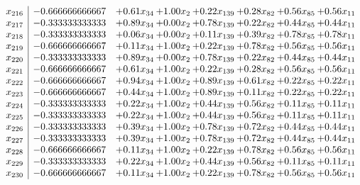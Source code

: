 \documentclass[8pt]{article}
\begin{document}
\[\begin{array}{c| c c@{\hskip 2pt} c@{\hskip 2pt} c@{\hskip 2pt} c@{\hskip 2pt} c@{\hskip 2pt} c@{\hskip 2pt} }
 x_{216}   &  -0.666666666667 & +  0.61 x_{34} & +  1.00 x_{2} & +  0.22 x_{139} & +  0.28 x_{82} & +  0.56 x_{85} & +  0.56 x_{11}\\
 x_{217}   &  -0.333333333333 & +  0.89 x_{34} & +  0.00 x_{2} & +  0.78 x_{139} & +  0.22 x_{82} & +  0.44 x_{85} & +  0.44 x_{11}\\
 x_{218}   &  -0.333333333333 & +  0.06 x_{34} & +  0.00 x_{2} & +  0.11 x_{139} & +  0.39 x_{82} & +  0.78 x_{85} & +  0.78 x_{11}\\
 x_{219}   &  -0.666666666667 & +  0.11 x_{34} & +  1.00 x_{2} & +  0.22 x_{139} & +  0.78 x_{82} & +  0.56 x_{85} & +  0.56 x_{11}\\
 x_{220}   &  -0.333333333333 & +  0.89 x_{34} & +  0.00 x_{2} & +  0.78 x_{139} & +  0.22 x_{82} & +  0.44 x_{85} & +  0.44 x_{11}\\
 x_{221}   &  -0.666666666667 & +  0.61 x_{34} & +  1.00 x_{2} & +  0.22 x_{139} & +  0.28 x_{82} & +  0.56 x_{85} & +  0.56 x_{11}\\
 x_{222}   &  -0.666666666667 & +  0.94 x_{34} & +  1.00 x_{2} & +  0.89 x_{139} & +  0.61 x_{82} & +  0.22 x_{85} & +  0.22 x_{11}\\
 x_{223}   &  -0.666666666667 & +  0.44 x_{34} & +  1.00 x_{2} & +  0.89 x_{139} & +  0.11 x_{82} & +  0.22 x_{85} & +  0.22 x_{11}\\
 x_{224}   &  -0.333333333333 & +  0.22 x_{34} & +  1.00 x_{2} & +  0.44 x_{139} & +  0.56 x_{82} & +  0.11 x_{85} & +  0.11 x_{11}\\
 x_{225}   &  -0.333333333333 & +  0.22 x_{34} & +  1.00 x_{2} & +  0.44 x_{139} & +  0.56 x_{82} & +  0.11 x_{85} & +  0.11 x_{11}\\
 x_{226}   &  -0.333333333333 & +  0.39 x_{34} & +  1.00 x_{2} & +  0.78 x_{139} & +  0.72 x_{82} & +  0.44 x_{85} & +  0.44 x_{11}\\
 x_{227}   &  -0.333333333333 & +  0.39 x_{34} & +  1.00 x_{2} & +  0.78 x_{139} & +  0.72 x_{82} & +  0.44 x_{85} & +  0.44 x_{11}\\
 x_{228}   &  -0.666666666667 & +  0.11 x_{34} & +  1.00 x_{2} & +  0.22 x_{139} & +  0.78 x_{82} & +  0.56 x_{85} & +  0.56 x_{11}\\
 x_{229}   &  -0.333333333333 & +  0.22 x_{34} & +  1.00 x_{2} & +  0.44 x_{139} & +  0.56 x_{82} & +  0.11 x_{85} & +  0.11 x_{11}\\
 x_{230}   &  -0.666666666667 & +  0.11 x_{34} & +  1.00 x_{2} & +  0.22 x_{139} & +  0.78 x_{82} & +  0.56 x_{85} & +  0.56 x_{11}\\

\end{array}\]
\end{document}
